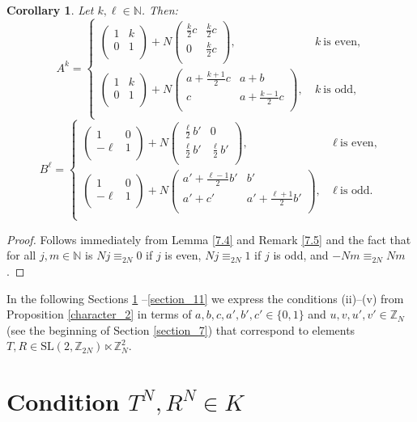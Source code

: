 \documentclass[10pt]{amsart}
\theoremstyle{plain}
\newtheorem{corollary}[theorem]{Corollary}
\theoremstyle{definition}
\theoremstyle{remark}%
\newcommand{\N}{\mathbb{N}}
\newcommand{\Z}{\mathbb{Z}}
\newcommand{\SL}{\mathrm{SL}}
\newcommand{\mat}[4]{\left(\begin{array}{cc}
 #1 & #2\\
 #3 & #4\\
\end{array}\right)}
\begin{document}
\begin{corollary}\label{7.6}
Let $k,\ell\in\N$. Then:
$$A^k=\begin{cases}
\mat{1}{k}{0}{1}+N\mat{\frac{k}{2}c}{\frac{k}{2}c}{0}{\frac{k}{2}c}, &\ k\ \text{is even,}\\[7mm]
\mat{1}{k}{0}{1}+N\mat{a+\frac{k+1}{2}c}{a+b}{c}{a+\frac{k-1}{2}c}, &\ k\ \text{is odd,}\\
\end{cases}$$
$$B^\ell=\begin{cases}
\mat{1}{0}{-\ell}{1}+N\mat{\frac{\ell}{2}b'}{0}{\frac{\ell}{2}b'}{\frac{\ell}{2}b'}, &\ \ell\ \text{is even,}\\[7mm]
\mat{1}{0}{-\ell}{1}+N\mat{a'+\frac{\ell-1}{2}b'}{b'}{a'+c'}{a'+\frac{\ell+1}{2}b'}, &\ \ell\ \text{is odd.}\\
\end{cases}$$
\end{corollary}
\begin{proof}
 Follows immediately from Lemma \ref{7.4} and Remark \ref{7.5} and the fact that for all $j,m\in\N$ is $Nj\equiv_{2N}0$ if $j$ is even, $Nj\equiv_{2N}1$ if $j$ is odd, and $-Nm\equiv_{2N} Nm$.
\end{proof}


In the following Sections \ref{section_8} --\ref{section_11} we express the conditions (ii)--(v) from Proposition \ref{character_2} in terms of $a,b,c,a',b',c'\in\{0,1\}$ and $u,v,u',v'\in\Z_N$ (see the beginning of Section \ref{section_7}) that correspond to elements $T,R\in\SL(2,\Z_{2N})\ltimes \Z_{N}^2$.




\section{Condition $T^{N},R^N\in K$}\label{section_8}
\end{document}
